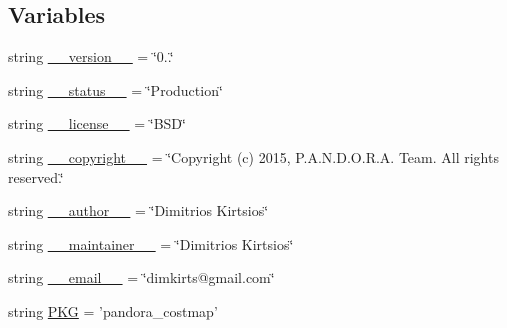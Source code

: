 \subsection*{\-Variables}
\begin{DoxyCompactItemize}
\item 
string \hyperlink{namespacepandora__costmap_1_1map__utils_aca92433681436fec09187025bd40bccf}{\-\_\-\-\_\-version\-\_\-\-\_\-} = \char`\"{}0..\char`\"{}
\item 
string \hyperlink{namespacepandora__costmap_1_1map__utils_acfbb9708421ce127d100923734e4ef17}{\-\_\-\-\_\-status\-\_\-\-\_\-} = \char`\"{}\-Production\char`\"{}
\item 
string \hyperlink{namespacepandora__costmap_1_1map__utils_aa690da73a0636457bb4c54dfb68f896b}{\-\_\-\-\_\-license\-\_\-\-\_\-} = \char`\"{}\-B\-S\-D\char`\"{}
\item 
string \hyperlink{namespacepandora__costmap_1_1map__utils_a744bfb25ed3cd3974a7fe7c552d5dfa5}{\-\_\-\-\_\-copyright\-\_\-\-\_\-} = \char`\"{}\-Copyright (c) 2015, \-P.\-A.\-N.\-D.\-O.\-R.\-A. \-Team. \-All rights reserved.\char`\"{}
\item 
string \hyperlink{namespacepandora__costmap_1_1map__utils_a031fac51be6c934bc7626b019126c672}{\-\_\-\-\_\-author\-\_\-\-\_\-} = \char`\"{}\-Dimitrios \-Kirtsios\char`\"{}
\item 
string \hyperlink{namespacepandora__costmap_1_1map__utils_a905c8bd3788234b3ca4806bd41486de0}{\-\_\-\-\_\-maintainer\-\_\-\-\_\-} = \char`\"{}\-Dimitrios \-Kirtsios\char`\"{}
\item 
string \hyperlink{namespacepandora__costmap_1_1map__utils_a80a136cf88b6006e4f0f546cf90b1768}{\-\_\-\-\_\-email\-\_\-\-\_\-} = \char`\"{}dimkirts@gmail.\-com\char`\"{}
\item 
string \hyperlink{namespacepandora__costmap_1_1map__utils_ac3078317fe26dbd0413057d7ea9af9be}{\-P\-K\-G} = 'pandora\-\_\-costmap'
\end{DoxyCompactItemize}


